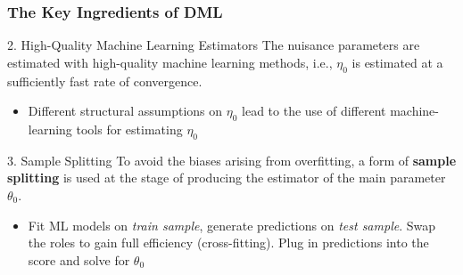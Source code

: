 \begin{frame}
\frametitle{The Key Ingredients of DML}
\begin{block}{2. High-Quality Machine Learning Estimators}
The nuisance parameters are estimated with high-quality machine learning methods, i.e., $\eta_0$ is estimated at a sufficiently fast rate of convergence.
\end{block}
\begin{itemize}
\item Different structural assumptions on $\eta_0$ lead to the use of different machine-learning tools for estimating $\eta_0$
\end{itemize}

\begin{block}{3. Sample Splitting}
To avoid the biases arising from overfitting, a form of \textbf{sample splitting} is used at the stage of producing the estimator of the main parameter $\theta_0$.
\end{block}
\begin{itemize}
\item Fit ML models on \textit{train sample}, generate predictions on \textit{test sample}. Swap the roles to gain full efficiency (cross-fitting). Plug in predictions into the score and solve for $\theta_0$
\end{itemize}
\end{frame}
%
%

